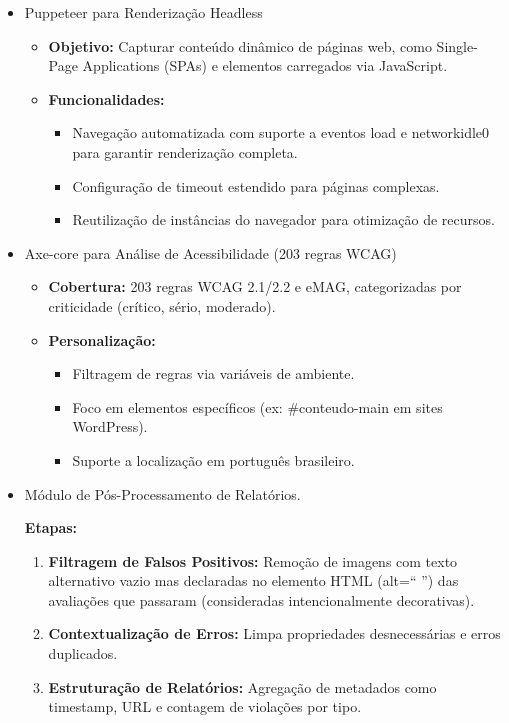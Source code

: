 \documentclass[12pt]{article}
\begin{document}
\begin{itemize}
\item Puppeteer para Renderização Headless\cite{puppeteer}
\begin{itemize}
    \item \textbf{Objetivo:} Capturar conteúdo dinâmico de páginas web, como Single-Page
    Applications (SPAs) e elementos carregados via JavaScript.
    \item \textbf{Funcionalidades:}
    \begin{itemize}
        \item Navegação automatizada com suporte a eventos load e networkidle0 para
        garantir renderização completa.
        \item Configuração de timeout estendido para páginas complexas.\@
        \item Reutilização de instâncias do navegador para otimização de recursos.
    \end{itemize}
\end{itemize}
\item Axe-core para Análise de Acessibilidade\cite{axecore} (203 regras WCAG)
\begin{itemize}
    \item \textbf{Cobertura:} 203 regras WCAG 2.1/2.2 e eMAG\cite{emag,wcag22}, categorizadas por criticidade
    (crítico, sério, moderado).
    \item \textbf{Personalização:} 
    \begin{itemize}
        \item Filtragem de regras via variáveis de ambiente.
        \item Foco em elementos específicos (ex: \#conteudo-main em sites
        WordPress).
        \item Suporte a localização em português brasileiro.
    \end{itemize}
\end{itemize}
\item Módulo de Pós-Processamento de Relatórios.

\textbf{Etapas:}
    \begin{enumerate}
        \item \textbf{Filtragem de Falsos Positivos:} Remoção de imagens com texto alternativo vazio
        mas declaradas no elemento HTML (alt=`` '') das avaliações que passaram 
        (consideradas intencionalmente decorativas).
        \item \textbf{Contextualização de Erros:} Limpa propriedades desnecessá\-rias e erros
        duplicados.
        \item \textbf{Estruturação de Relatórios:} Agregação de metadados como timestamp, URL e
        contagem de violações por tipo.
    \end{enumerate}
\end{itemize}
\end{document}
